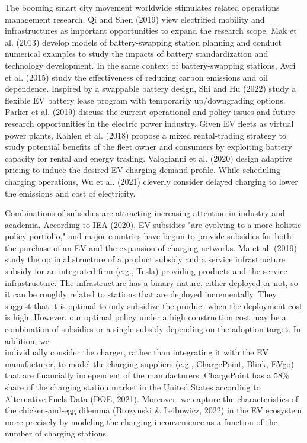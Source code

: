 \documentclass[10pt]{article}
\begin{document}
The booming smart city movement worldwide stimulates related operations management research. Qi and Shen (2019) view electrified mobility and infrastructures as important opportunities to expand the research scope. Mak et al. (2013) develop models of battery-swapping station planning and conduct numerical examples to study the impacts of battery standardization and technology development. In the same context of battery-swapping stations, Avci et al. (2015) study the effectiveness of reducing carbon emissions and oil dependence. Inspired by a swappable battery design, Shi and Hu (2022) study a flexible EV battery lease program with temporarily up/downgrading options. Parker et al. (2019) discuss the current operational and policy issues and future research opportunities in the electric power industry. Given EV fleets as virtual power plants, Kahlen et al. (2018) propose a mixed rental-trading strategy to study potential benefits of the fleet owner and consumers by exploiting battery capacity for rental and energy trading. Valogianni et al. (2020) design adaptive pricing to induce the desired EV charging demand profile. While scheduling charging operations, Wu et al. (2021) cleverly consider delayed charging to lower the emissions and cost of electricity.

Combinations of subsidies are attracting increasing attention in industry and academia. According to IEA (2020), EV subsidies "are evolving to a more holistic policy portfolio," and major countries have begun to provide subsidies for both the purchase of an EV and the expansion of charging networks. Ma et al. (2019) study the optimal structure of a product subsidy and a service infrastructure subsidy for an integrated firm (e.g., Tesla) providing products and the service infrastructure. The infrastructure has a binary nature, either deployed or not, so it can be roughly related to stations that are deployed incrementally. They suggest that it is optimal to only subsidize the product when the deployment cost is high. However, our optimal policy under a high construction cost may be a combination of subsidies or a single subsidy depending on the adoption target. In addition, we\\
individually consider the charger, rather than integrating it with the EV manufacturer, to model the charging suppliers (e.g., ChargePoint, Blink, EVgo) that are financially independent of the manufacturers. ChargePoint has a $58 \%$ share of the charging station market in the United States according to Alternative Fuels Data (DOE, 2021). Moreover, we capture the characteristics of the chicken-and-egg dilemma (Brozynski \& Leibowicz, 2022) in the EV ecosystem more precisely by modeling the charging inconvenience as a function of the number of charging stations.
\end{document}
